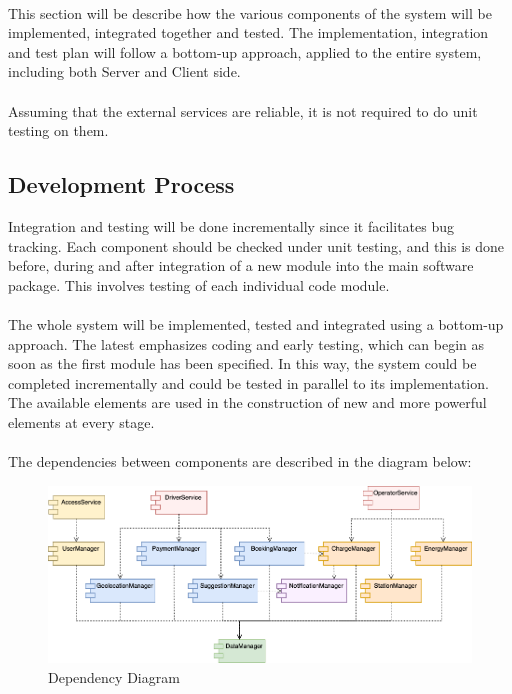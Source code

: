 \documentclass[../main.tex]{subfiles}
\begin{document}
\\
\noindent
This section will be describe how the various components of the system will be implemented, integrated together and tested. 
The implementation, integration and test plan will follow a bottom-up approach, applied to the entire system, including both Server and Client side. \\
\\
Assuming that the external services are reliable, it is not required to do unit testing on them. 


\subsection{Development Process}
Integration and testing will be done incrementally since it facilitates bug tracking. 
Each component should be checked under unit testing, and this is done before, during and after integration of a new module into the main software package. This involves testing of each individual code module. 
\\
\\
The whole system will be implemented, tested and integrated using a bottom-up approach. The latest emphasizes coding and early testing, which can begin as soon as the first module has been specified. In this way, the system could be completed incrementally and could be tested in parallel to its implementation. The available elements are used in the construction of new and more powerful elements at every stage. 
\\
\\
The dependencies between components are described in the diagram below: 


\begin{figure}[H]
\centering
    \includegraphics[width=1.05\textwidth]{images/DependencyDiagram.png}
    \caption{Dependency Diagram}
    \label{fig:deploymentDiagram}
\end{figure}
\end{document}
